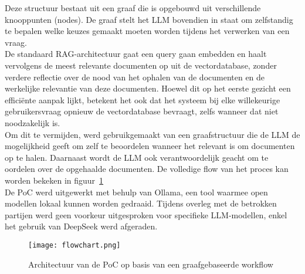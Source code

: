 Deze structuur bestaat uit een graaf die is opgebouwd uit verschillende knooppunten (nodes). De graaf stelt het LLM bovendien in staat om zelfstandig te bepalen welke keuzes gemaakt moeten worden tijdens het verwerken van een vraag.
\\[1em]
De standaard RAG-architectuur gaat een query gaan embedden en haalt vervolgens de meest relevante documenten op uit de vectordatabase, zonder verdere reflectie over de nood van het ophalen van de documenten en de werkelijke relevantie van deze documenten. Hoewel dit op het eerste gezicht een efficiënte aanpak lijkt, betekent het ook dat het systeem bij elke willekeurige gebruikersvraag opnieuw de vectordatabase bevraagt, zelfs wanneer dat niet noodzakelijk is.
\\[1em]
Om dit te vermijden, werd gebruikgemaakt van een graafstructuur die de LLM de mogelijkheid geeft om zelf te beoordelen wanneer het relevant is om documenten op te halen. Daarnaast wordt de LLM ook verantwoordelijk geacht om te oordelen over de opgehaalde documenten. De volledige flow van het proces kan worden bekeken in figuur~\ref{fig:Architectuur}
\\[1em]
De PoC werd uitgewerkt met behulp van Ollama, een tool waarmee open modellen lokaal kunnen worden gedraaid. Tijdens overleg met de betrokken partijen werd geen voorkeur uitgesproken voor specifieke LLM-modellen, enkel het gebruik van DeepSeek werd afgeraden.

\begin{figure}[H]
    \texttt{[image: flowchart.png]}
    \caption{Architectuur van de PoC op basis van een graafgebaseerde workflow}
    \label{fig:Architectuur}
\end{figure}


